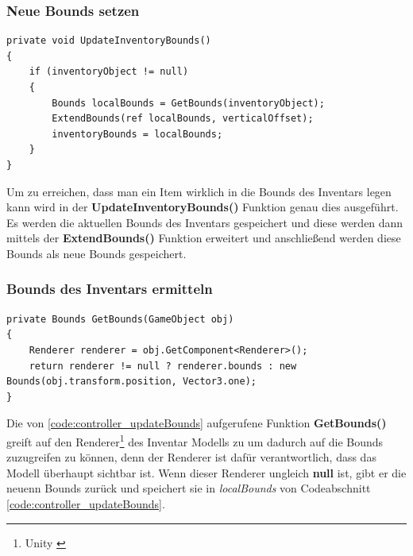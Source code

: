 \subsubsection{Neue Bounds setzen}
\begin{lstlisting}[style=csharp, caption={Funktion um Inventar Bounds zu erweitern}, label=code:controller_updateBounds]
private void UpdateInventoryBounds()
{
    if (inventoryObject != null)
    {
        Bounds localBounds = GetBounds(inventoryObject);
        ExtendBounds(ref localBounds, verticalOffset);
        inventoryBounds = localBounds;
    }
}
\end{lstlisting}
Um zu erreichen, dass man ein Item wirklich in die Bounds des Inventars legen kann wird in der \textbf{UpdateInventoryBounds()}
Funktion genau dies ausgeführt. Es werden die aktuellen Bounds des Inventars gespeichert und diese werden dann mittels
der \textbf{ExtendBounds()} Funktion erweitert und anschließend werden diese Bounds als neue Bounds gespeichert.\\

\subsubsection{Bounds des Inventars ermitteln}
\begin{lstlisting}[style=csharp, caption={Funktion um Bounds zu ermitteln}, label=code:controller_getBounds]
private Bounds GetBounds(GameObject obj)
{
    Renderer renderer = obj.GetComponent<Renderer>();
    return renderer != null ? renderer.bounds : new Bounds(obj.transform.position, Vector3.one);
}
\end{lstlisting}
Die von \ref{code:controller_updateBounds} aufgerufene Funktion \textbf{GetBounds()} greift auf den Renderer\footnote{Unity \cite{Renderer}}
des Inventar Modells zu um dadurch auf die Bounds zuzugreifen zu können, denn der Renderer ist dafür verantwortlich,
dass das Modell überhaupt sichtbar ist. Wenn dieser Renderer ungleich \textbf{null} ist, gibt er die neuenn Bounds zurück und speichert
sie in \textit{localBounds} von Codeabschnitt \ref{code:controller_updateBounds}.\\

